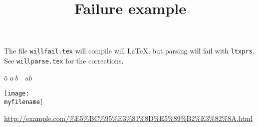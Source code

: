 \documentclass[french]{article}
\newcommand{\myfilename}{"$HOME/toto.png"}
\newcommand{\myurl}{\url{http://example.com/\%E5\%BC\%95\%E3\%81\%8D\%E5\%89\%B2\%E3\%82\%8A.html}}
\begin{document}
{}
\title{Failure example}
The file \texttt{willfail.tex} will compile will \LaTeX, but parsing will fail with \texttt{ltxprs}.
See \texttt{willparse.tex} for the corrections. 



\~o $a\: b\quad ab$

\texttt{[image: \\myfilename]}

\myurl

\end{document}
